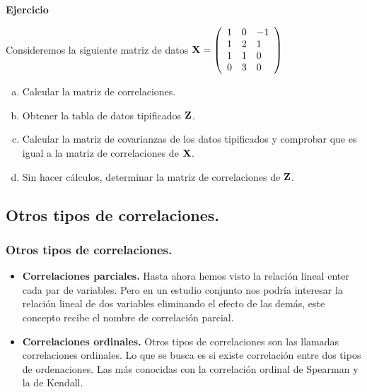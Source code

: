\begin{frame}

\textbf{Ejercicio}


Consideremos la siguiente matriz de datos 
$\mathbf{X}=\left(
\begin{array}{lll}
 1 & 0 & -1 \\
 1 & 2 & 1 \\
 1 & 1 & 0 \\
 0 & 3 & 0
\end{array}
\right)$
\begin{enumerate}[a)]
\item  Calcular la matriz de correlaciones.
\item  Obtener la tabla de datos tipificados $\mathbf{Z}$. 
\item  Calcular la matriz de covarianzas de los datos tipificados y comprobar que es igual a la matriz de correlaciones de $\mathbf{X}$.
\item  Sin hacer cálculos, determinar la matriz de correlaciones de $\mathbf{Z}$.
\end{enumerate}
\end{frame}
\subsection{Otros tipos de correlaciones.}
\begin{frame}
\frametitle{Otros tipos de correlaciones.}
 \begin{itemize}
\item \textbf{Correlaciones parciales.}
Hasta ahora hemos visto la relación lineal enter cada par de variables. Pero en un estudio conjunto nos podría interesar  la relación lineal de dos variables eliminando el efecto de las demás, este concepto recibe el nombre de correlación parcial.
\item \textbf{Correlaciones ordinales.}
Otros tipos de correlaciones son las llamadas correlaciones ordinales. Lo que se busca es si existe correlación entre dos tipos de ordenaciones. Las más conocidas con la correlación ordinal de Spearman y la de Kendall.
\end{itemize}



\end{frame}


